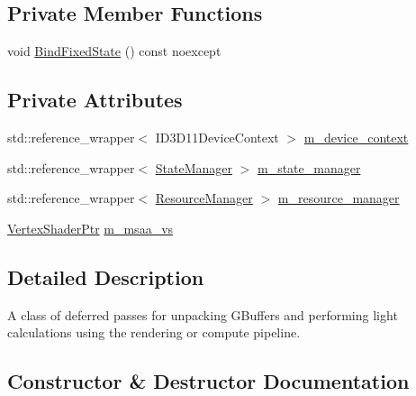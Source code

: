 \subsection*{Private Member Functions}
\begin{DoxyCompactItemize}
\item 
void \mbox{\hyperlink{classmage_1_1rendering_1_1_deferred_pass_ab0d7b1aa091b0884dcb1e628c997f38b}{Bind\+Fixed\+State}} () const noexcept
\end{DoxyCompactItemize}
\subsection*{Private Attributes}
\begin{DoxyCompactItemize}
\item 
std\+::reference\+\_\+wrapper$<$ I\+D3\+D11\+Device\+Context $>$ \mbox{\hyperlink{classmage_1_1rendering_1_1_deferred_pass_afd07209849a7969475c9110fbdb0c4a4}{m\+\_\+device\+\_\+context}}
\item 
std\+::reference\+\_\+wrapper$<$ \mbox{\hyperlink{classmage_1_1rendering_1_1_state_manager}{State\+Manager}} $>$ \mbox{\hyperlink{classmage_1_1rendering_1_1_deferred_pass_aaeabb408d0454f13fdabad2a8e668f61}{m\+\_\+state\+\_\+manager}}
\item 
std\+::reference\+\_\+wrapper$<$ \mbox{\hyperlink{classmage_1_1rendering_1_1_resource_manager}{Resource\+Manager}} $>$ \mbox{\hyperlink{classmage_1_1rendering_1_1_deferred_pass_a542cc2833e2df7b7697f2c1d769dce36}{m\+\_\+resource\+\_\+manager}}
\item 
\mbox{\hyperlink{namespacemage_1_1rendering_aaf704b9c54a4181f4950a1761de69dda}{Vertex\+Shader\+Ptr}} \mbox{\hyperlink{classmage_1_1rendering_1_1_deferred_pass_aea0ac2159ea383b80fcbc603a6b86363}{m\+\_\+msaa\+\_\+vs}}
\end{DoxyCompactItemize}


\subsection{Detailed Description}
A class of deferred passes for unpacking G\+Buffers and performing light calculations using the rendering or compute pipeline. 

\subsection{Constructor \& Destructor Documentation}
\mbox{\label{classmage_1_1rendering_1_1_deferred_pass_a3543b3f27812467d425d579d2e226a7a}} 
